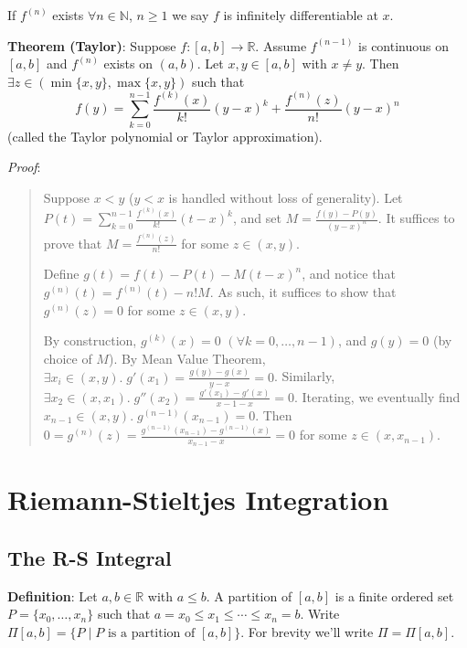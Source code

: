 \documentclass[11pt]{article}
\begin{document}
If $f^{(n)}$ exists $\forall n \in \mathbb{N}$, $n \geq 1$ we say $f$ is infinitely differentiable at $x$.

\textbf{Theorem (Taylor)}: Suppose $f : [a,b] \to \mathbb{R}$. Assume $f^{(n-1)}$ is continuous on $[a,b]$ and $f^{(n)}$ exists on $(a,b)$. Let $x,y \in [a,b]$ with $x \neq y$. Then $\exists z \in (\min\{x,y\}, \max\{x,y\})$ such that
\begin{displaymath}
f(y) = \sum_{k=0}^{n-1} \frac{f^{(k)}(x)}{k!} (y-x)^k + \frac{f^{(n)}(z)}{n!} (y-x)^n
\end{displaymath}
(called the Taylor polynomial or Taylor approximation).

\emph{Proof}:
\begin{quote}\vspace{-0.3cm}
Suppose $x < y$ ($y < x$ is handled without loss of generality). Let $P(t) = \sum_{k=0}^{n-1} \frac{f^{(k)}(x)}{k!} (t-x)^k$, and set $M = \frac{f(y) - P(y)}{(y-x)^n}$. It suffices to prove that $M = \frac{f^{(n)}(z)}{n!}$ for some $z \in (x,y)$.

Define $g(t) = f(t) - P(t) - M(t-x)^n$, and notice that $g^{(n)}(t) = f^{(n)}(t) - n!M$. As such, it suffices to show that $g^{(n)}(z) = 0$ for some $z \in (x,y)$.

By construction, $g^{(k)}(x) = 0$ $(\forall k = 0, \ldots, n-1)$, and $g(y) = 0$ (by choice of $M$). By Mean Value Theorem, $\exists x_i \in (x,y).\; g'(x_1) = \frac{g(y) - g(x)}{y-x} = 0$. Similarly, $\exists x_2 \in (x, x_1).\; g''(x_2) = \frac{g'(x_1) - g'(x)}{x-1 - x} = 0$. Iterating, we eventually find $x_{n-1} \in (x,y).\; g^{(n-1)}(x_{n-1}) = 0$. Then $0 = g^{(n)}(z) = \frac{g^{(n-1)}(x_{n-1}) - g^{(n-1)}(x)}{x_{n-1} - x} = 0$ for some $z \in (x, x_{n-1})$.
\end{quote}

\section{Riemann-Stieltjes Integration}

\subsection{The R-S Integral}

\textbf{Definition}: Let $a,b \in \mathbb{R}$ with $a \leq b$. A partition of $[a,b]$ is a finite ordered set $P = \{x_0, \ldots, x_n\}$ such that $a = x_0 \leq x_1 \leq \cdots \leq x_n = b$. Write $\Pi[a,b] = \{P \mid P \text{ is a partition of }[a,b]\}$. For brevity we'll write $\Pi = \Pi[a,b]$.
\end{document}
